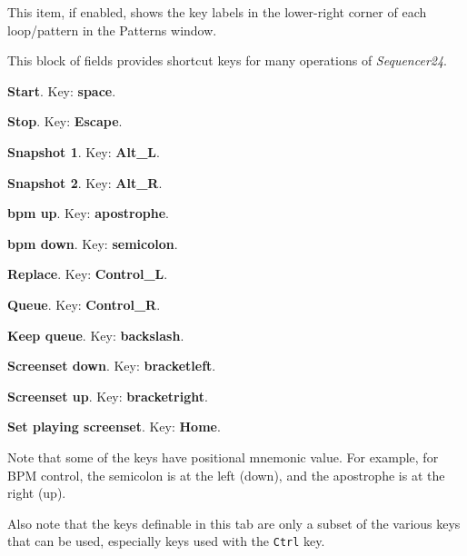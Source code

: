    \setcounter{ItemCounter}{0}      %

   This item, if enabled, shows the key labels in the lower-right corner of
   each loop/pattern in the Patterns window.

   This block of fields provides shortcut keys for many operations of
   \textsl{Sequencer24}.

   \begin{enumber}
      \item \textbf{Start}.
         Key:  \textbf{space}.
      \item \textbf{Stop}.
         Key:  \textbf{Escape}.
      \item \textbf{Snapshot 1}.
         Key:  \textbf{Alt\_L}.
      \item \textbf{Snapshot 2}.
         Key:  \textbf{Alt\_R}.
      \item \textbf{bpm up}.
         Key:  \textbf{apostrophe}.
      \item \textbf{bpm down}.
         Key:  \textbf{semicolon}.
      \item \textbf{Replace}.
         Key:  \textbf{Control\_L}.
      \item \textbf{Queue}.
         Key:  \textbf{Control\_R}.
      \item \textbf{Keep queue}.
         Key:  \textbf{backslash}.
      \item \textbf{Screenset down}.
         Key: \index{keys![} \textbf{bracketleft}.
      \item \textbf{Screenset up}.
         Key: \index{keys!]} \textbf{bracketright}.
      \item \textbf{Set playing screenset}.
         Key:  \textbf{Home}.
   \end{enumber}

   Note that some of the keys have positional mnemonic value.  For example,
   for BPM control, the semicolon is at the left (down), and the apostrophe
   is at the right (up).

   Also note that the keys definable in this tab are only a subset of the
   various keys that can be used, especially keys used with the
   \texttt{Ctrl} key.

